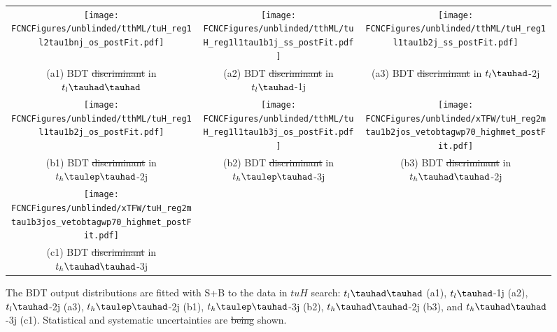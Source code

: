 \documentclass[PAPER, coverpage, atlasdraft=true, texlive=2016, UKenglish]{\ATLASLATEXPATH atlasdoc}
\providecommand{\DIFdel}[1]{{\protect\color{red}\sout{#1}}}                      %
\providecommand{\DIFdelFL}[1]{\DIFdel{#1}} %
\providecommand{\DIFdelbeginFL}{} %
\providecommand{\DIFdelendFL}{} %
\begin{document}
\begin{figure}[H]
\begin{tabular}{@{}ccc@{}}
\texttt{[image: \\FCNCFigures/unblinded/tthML/tuH\_reg1l2tau1bnj\_os\_postFit.pdf]}&
\texttt{[image: \\FCNCFigures/unblinded/tthML/tuH\_reg1l1tau1b1j\_ss\_postFit.pdf]}&
\texttt{[image: \\FCNCFigures/unblinded/tthML/tuH\_reg1l1tau1b2j\_ss\_postFit.pdf]}\\
(a1) BDT \DIFdelbeginFL \DIFdelFL{discriminant }\DIFdelendFL in $t_l\thadhad$ & (a2) BDT \DIFdelbeginFL \DIFdelFL{discriminant }\DIFdelendFL in  $t_l\tauhad$-1j& (a3) BDT \DIFdelbeginFL \DIFdelFL{discriminant }\DIFdelendFL in $t_l\tauhad$-2j\\
\texttt{[image: \\FCNCFigures/unblinded/tthML/tuH\_reg1l1tau1b2j\_os\_postFit.pdf]}&
\texttt{[image: \\FCNCFigures/unblinded/tthML/tuH\_reg1l1tau1b3j\_os\_postFit.pdf]}&
\texttt{[image: \\FCNCFigures/unblinded/xTFW/tuH\_reg2mtau1b2jos\_vetobtagwp70\_highmet\_postFit.pdf]}\\
(b1) BDT \DIFdelbeginFL \DIFdelFL{discriminant }\DIFdelendFL in $t_h\tlhad$-2j & (b2) BDT \DIFdelbeginFL \DIFdelFL{discriminant }\DIFdelendFL in  $t_h\tlhad$-3j & (b3) BDT \DIFdelbeginFL \DIFdelFL{discriminant }\DIFdelendFL in $t_h\thadhad$-2j \\
\texttt{[image: \\FCNCFigures/unblinded/xTFW/tuH\_reg2mtau1b3jos\_vetobtagwp70\_highmet\_postFit.pdf]}&\\
(c1) BDT \DIFdelbeginFL \DIFdelFL{discriminant }\DIFdelendFL in$t_h\thadhad$-3j\\
\end{tabular}
\caption{ The BDT output distributions are fitted with S+B to the data in $tuH$ search: $t_l\thadhad$ (a1),  $t_l\tauhad$-1j (a2),  $t_l\tauhad$-2j (a3),
  $t_h\tlhad$-2j (b1), $t_h\tlhad$-3j (b2), $t_h\thadhad$-2j (b3), and $t_h\thadhad$-3j (c1). Statistical and systematic uncertainties are \DIFdelbeginFL \DIFdelFL{being }\DIFdelendFL shown.}
\label{fig:asimov_postfitbdtHu}
\end{figure}
\end{document}
